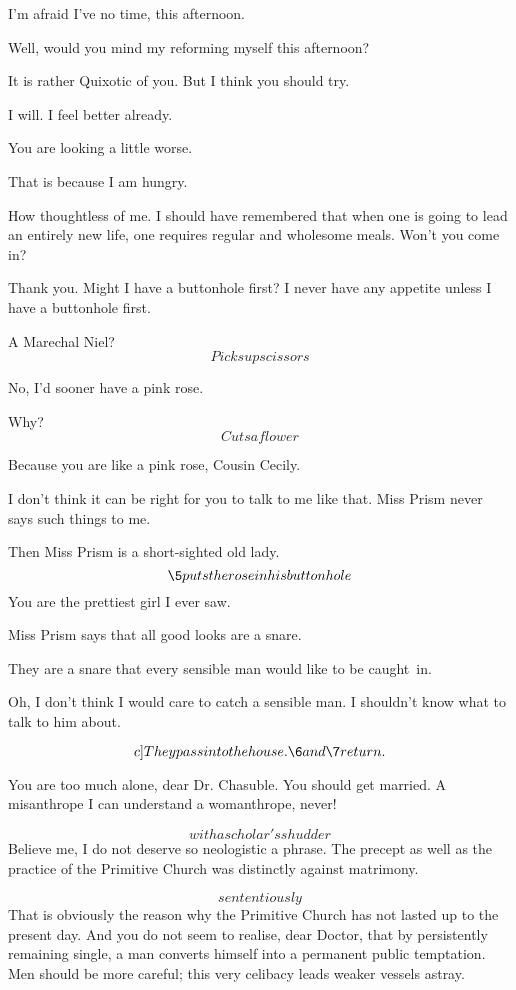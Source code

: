 \documentclass{book}
\begin{document}
\5  I'm afraid I've no time, this afternoon.

\2  Well, would you mind my reforming myself this afternoon?

\5  It is rather Quixotic of you.  But I think you should try.

\2  I will.  I feel better already.

\5  You are looking a little worse.

\2  That is because I am hungry.

\5  How thoughtless of me.  I should have remembered that when
one is going to lead an entirely new life, one requires regular and
wholesome meals.  Won't you come in?

\2  Thank you.  Might I have a buttonhole first?  I never
have any appetite unless I have a buttonhole first.

\5  A Marechal Niel?  \[Picks up scissors\]

\2  No, I'd sooner have a pink rose.

\5  Why?  \[Cuts a flower\]

\2  Because you are like a pink rose, Cousin Cecily.

\5  I don't think it can be right for you to talk to me like
that.  Miss Prism never says such things to me.

\2  Then Miss Prism is a short-sighted old lady.  \[\5
puts the rose in his buttonhole\]  You are the prettiest girl I
ever saw.

\5  Miss Prism says that all good looks are a snare.

\2  They are a snare that every sensible man would like to
be caught~in.

\5  Oh, I don't think I would care to catch a sensible man.  I
shouldn't know what to talk to him about.

\[c]They pass into the house.  \6 and \7 return.\]

\6  You are too much alone, dear Dr. Chasuble.  You should
get married.  A misanthrope I can understand \textemdash a womanthrope,
never!

\7  \[with a scholar's shudder\]  Believe me, I do not
deserve so neologistic a phrase.  The precept as well as the
practice of the Primitive Church was distinctly against matrimony.

\6  \[sententiously\]  That is obviously the reason why the
Primitive Church has not lasted up to the present day.  And you do
not seem to realise, dear Doctor, that by persistently remaining
single, a man converts himself into a permanent public temptation.
Men should be more careful; this very celibacy leads weaker vessels
astray.
\end{document}
